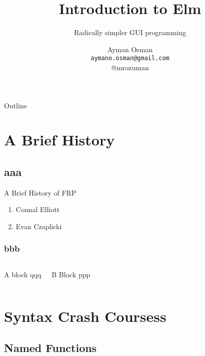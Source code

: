 \documentclass{beamer}
\title{Introduction to Elm}
\subtitle{Radically simpler GUI programming}
\author[Ayman Osman]{
  Ayman Osman
  \\ \texttt{aymano.osman@gmail.com}
  \\ @mrozuman
}
\begin{document}
\begin{frame}
  \titlepage
\end{frame}

\begin{frame}{Outline}
  \tableofcontents
\end{frame}


\section{A Brief History}

\subsection{aaa}

\begin{frame}{A Brief History of FRP}
  \begin{enumerate}
  \item Connal Elliott
  \item Evan Czaplicki
  \end{enumerate}
\end{frame}


\begin{frame}
  \frametitle{bbb}

  \begin{columns}[t]
    \begin{block}{A block}
      qqq
    \end{block}

    \begin{block}{B Block}
      ppp
    \end{block}
  \end{columns}
\end{frame}



  


\section{Syntax Crash Coursess}
\subsection{Named Functions}
\end{document}
